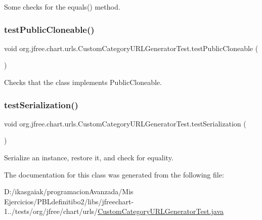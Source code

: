 Some checks for the equals() method. \mbox{\label{classorg_1_1jfree_1_1chart_1_1urls_1_1_custom_category_u_r_l_generator_test_a9573211347f5a6161493940a97eee9a0}} 
\subsubsection{\texorpdfstring{test\+Public\+Cloneable()}{testPublicCloneable()}}
{\footnotesize\ttfamily void org.\+jfree.\+chart.\+urls.\+Custom\+Category\+U\+R\+L\+Generator\+Test.\+test\+Public\+Cloneable (\begin{DoxyParamCaption}{ }\end{DoxyParamCaption})}

Checks that the class implements Public\+Cloneable. \mbox{\label{classorg_1_1jfree_1_1chart_1_1urls_1_1_custom_category_u_r_l_generator_test_a8b906bc045581614bf111868c8456cd7}} 
\subsubsection{\texorpdfstring{test\+Serialization()}{testSerialization()}}
{\footnotesize\ttfamily void org.\+jfree.\+chart.\+urls.\+Custom\+Category\+U\+R\+L\+Generator\+Test.\+test\+Serialization (\begin{DoxyParamCaption}{ }\end{DoxyParamCaption})}

Serialize an instance, restore it, and check for equality. 

The documentation for this class was generated from the following file\+:\begin{DoxyCompactItemize}
\item 
D\+:/ikasgaiak/programacion\+Avanzada/\+Mis Ejercicios/\+P\+B\+Ldefinitibo2/libs/jfreechart-\/1../tests/org/jfree/chart/urls/\mbox{\hyperlink{_custom_category_u_r_l_generator_test_8java}{Custom\+Category\+U\+R\+L\+Generator\+Test.\+java}}\end{DoxyCompactItemize}
